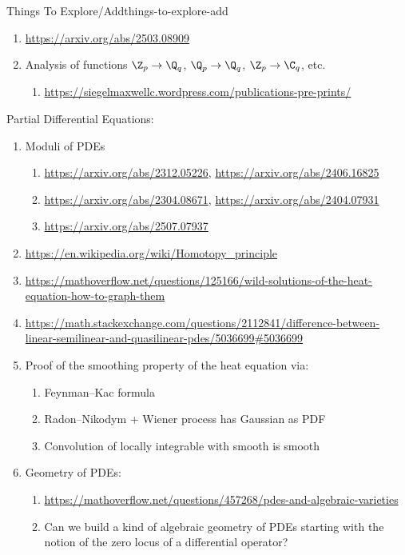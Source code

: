 \begin{remark}{Things To Explore/Add}{things-to-explore-add}
\begin{enumerate}
        \item \url{https://arxiv.org/abs/2503.08909}
        \item Analysis of functions $\Z_{p}\to\Q_{q}$, $\Q_{p}\to\Q_{q}$, $\Z_{p}\to\C_{q}$, etc.
            \begin{enumerate}
                \item \url{https://siegelmaxwellc.wordpress.com/publications-pre-prints/}
            \end{enumerate}
    \end{enumerate}
    Partial Differential Equations:
    \begin{enumerate}
        \item Moduli of PDEs
            \begin{enumerate}
                \item \url{https://arxiv.org/abs/2312.05226}, \url{https://arxiv.org/abs/2406.16825}
                \item \url{https://arxiv.org/abs/2304.08671}, \url{https://arxiv.org/abs/2404.07931}
                \item \url{https://arxiv.org/abs/2507.07937}
            \end{enumerate}
        \item \url{https://en.wikipedia.org/wiki/Homotopy_principle}
        \item \url{https://mathoverflow.net/questions/125166/wild-solutions-of-the-heat-equation-how-to-graph-them}
        \item \url{https://math.stackexchange.com/questions/2112841/difference-between-linear-semilinear-and-quasilinear-pdes/5036699\#5036699}
        \item Proof of the smoothing property of the heat equation via:
            \begin{enumerate}
                \item Feynman--Kac formula
                \item Radon--Nikodym + Wiener process has Gaussian as PDF
                \item Convolution of locally integrable with smooth is smooth
            \end{enumerate}
        \item Geometry of PDEs:
            \begin{enumerate}
                \item \url{https://mathoverflow.net/questions/457268/pdes-and-algebraic-varieties}
                \item Can we build a kind of algebraic geometry of PDEs starting with the notion of the zero locus of a differential operator?

\end{enumerate}
\end{enumerate}
\end{remark}
